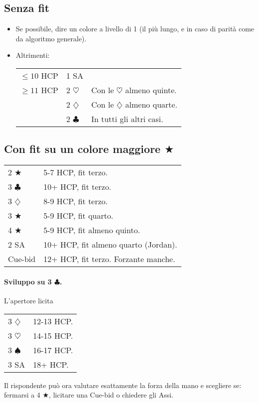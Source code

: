 \documentclass[a4paper,10pt]{article}
\renewcommand{\c}{$\clubsuit$\xspace}
\renewcommand{\d}{$\diamondsuit$\xspace}
\newcommand{\h}{$\heartsuit$\xspace}
\newcommand{\s}{$\spadesuit$\xspace}
\renewcommand{\j}{$\bigstar$\xspace}
\newcommand{\sa}{SA\xspace}
\newcommand{\smallspace}{\vskip0.3cm}
\newenvironment{twocol}
  {\smallspace\noindent\begin{tabular}{l p{0.8\textwidth}}}
  {\end{tabular}\smallspace}
\newenvironment{threecol}
  {\smallspace\noindent\begin{tabular}{l l p{0.7\textwidth}}}
  {\end{tabular}\smallspace}
\begin{document}
\subsection{Senza fit}

\begin{itemize}
 \item Se possibile, dire un colore a livello di 1 (il pi\`u lungo, e in caso di parit\`a come da algoritmo generale).
 \item Altrimenti:
  \begin{threecol}
    $\leq 10$ HCP & 1 \sa & \\
    $\geq 11$ HCP & 2 \h & Con le \h almeno quinte.\\
    & 2 \d & Con le \d almeno quarte.\\
    & 2 \c & In tutti gli altri casi.\\
  \end{threecol}
\end{itemize}


\subsection{Con fit su un colore maggiore \j}

\begin{twocol}
 2 \j  & 5-7 HCP, fit terzo.\\
 3 \c & 10+ HCP, fit terzo.\\
 3 \d & 8-9 HCP, fit terzo.\\
 3 \j  & 5-9 HCP, fit quarto.\\
 4 \j  & 5-9 HCP, fit almeno quinto.\\
 2 \sa & 10+ HCP, fit almeno quarto (Jordan).\\
 Cue-bid & 12+ HCP, fit terzo. Forzante manche.
\end{twocol}

\paragraph{Sviluppo su 3 \c.} L'apertore licita
\begin{twocol}
 3 \d & 12-13 HCP.\\
 3 \h & 14-15 HCP.\\
 3 \s & 16-17 HCP.\\
 3 \sa & 18+ HCP.
\end{twocol}

Il rispondente può ora valutare esattamente la forza della mano e scegliere se: fermarsi a 4 \j, licitare una Cue-bid o chiedere gli Assi.
\end{document}
